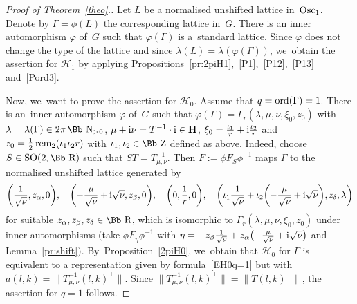 \documentclass[10pt,a4paper]{amsart}
\newcommand\RR{{\mbox{\Bb R}}}
\newcommand\NN{{\mbox{\Bb N}}}
\newcommand\ZZ{{\mbox{\Bb Z}}}
\newcommand\cH{{\mathcal H}}
\newcommand\cF{{\mathcal F}}
\newcommand\ph{\varphi}
\newcommand{\SO}{\mathop{{\rm SO}}}
\newcommand{\Osc}{{\rm Osc}}
\newcommand{\rem}{\mathop{{\rm rem}}}
\newcommand{\ord}{{\rm ord}}
\numberwithin{equation}{section}
\begin{document}
\begin{proof}[Proof of Theorem~\ref{theo}.]
Let $L$ be a normalised unshifted lattice in~$\Osc_1$. Denote by $\Gamma=\phi(L)$ the corresponding lattice in~$G$.
There is an inner automorphism $\varphi$ of~$G$ such that $\varphi(\Gamma)$ is a~standard lattice. Since $\ph$ does not change the type of the lattice and
since $\lambda(L)=\lambda(\ph(\Gamma))$,
we~obtain the assertion for $\cH_1$ by applying Propositions~\ref{pr:2piH1},~\ref{P1},~\ref{P12},~\ref{P13} and~\ref{Pord3}.

Now, we~want to prove the assertion for $\cH_0$. Assume that $q=\ord(\Gamma)=1$. There is an~inner automorphism $\varphi$ of~$G$ such that $\varphi(\Gamma)=\Gamma_r(\lambda,\mu,\nu,\xi_0,z_0)$ with $\lambda=\lambda(\Gamma)\in 2\pi\,\NN_{>0}$, $\mu+{\rm i}\nu=T^{-1}\cdot {\rm i}\in\textbf{H}$, $\xi_0=\frac{\iota_1}{r}+{\rm i}\frac{\iota_2}{r}$ and $z_0=\frac{1}{2}\rem_2(\iota_1\iota_2r)$ with $\iota_1,\iota_2\in\ZZ$ defined as above.
Indeed, choose $S\in\SO(2,\RR)$ such that $ST=T_{\mu,\nu}^{-1}$. Then $F:=\phi F_{S}\phi^{-1}$ maps $\Gamma$ to the normalised unshifted lattice generated by
\begin{gather*}
\bigg(\frac 1{\sqrt\nu},z_\alpha,0\bigg),\quad
\bigg({-}\frac{\mu}{\sqrt\nu}+{\rm i}\sqrt\nu,z_\beta,0\bigg),\quad
\bigg(0,\frac{1}{r},0\bigg),\quad
\bigg(\iota_1\frac 1{\sqrt\nu}+\iota_2\bigg({-}\frac{\mu}{\sqrt\nu}+{\rm i}\sqrt\nu\bigg),z_\delta,\lambda\bigg)
\end{gather*}
for suitable $z_\alpha,z_\beta,z_\delta\in\RR$, which is isomorphic to $\Gamma_r(\lambda,\mu,\nu,\xi_0,z_0)$ under inner automorphisms $\big($take $\phi F_\eta\phi^{-1}$ with $\eta=-z_\beta\frac 1{\sqrt\nu}+z_\alpha\big({-}\frac{\mu}{\sqrt\nu}+{\rm i}\sqrt\nu\big)$ and Lemma~\ref{pr:shift}$\big)$. By~Proposition~\ref{2piH0}, we~ob\-tain that $\cH_0$ for $\Gamma$ is equivalent to a representation given by formula~\eqref{EH0q=1} but with $a(l,k)=\big\|T_{\mu,\nu}^{-1}(l,k)^\top\big\|$.
Since $\big\|T_{\mu,\nu}^{-1}(l,k)^\top\big\|=\big\|T(l,k)^\top\big\|$, the assertion for $q=1$ follows.


\end{proof}
\end{document}
